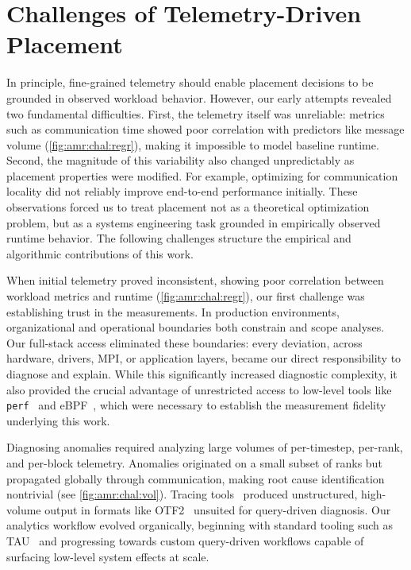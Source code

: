 \section{Challenges of Telemetry-Driven Placement}
\label{sec:amr:chal}


\figAmrChalRegr
\figAmrChalVol

In principle, fine-grained telemetry should enable placement decisions to be grounded in observed
workload behavior.
However, our early attempts revealed two fundamental difficulties.
First, the telemetry itself was unreliable: metrics such as communication time showed poor
correlation with predictors like message volume (\cref{fig:amr:chal:regr}), making it impossible to
model baseline runtime.
Second, the magnitude of this variability also changed unpredictably as placement properties
were modified.
For example, optimizing for communication locality did not reliably improve end-to-end performance
initially.
These observations forced us to treat placement not as a theoretical optimization problem, but as a
systems engineering task grounded in empirically observed runtime behavior.
The following challenges structure the empirical and algorithmic contributions of this work.


When initial telemetry proved inconsistent, showing poor correlation between workload metrics and
runtime (\cref{fig:amr:chal:regr}), our first challenge was establishing trust in the measurements.
In production environments, organizational and operational boundaries both constrain and scope
analyses.
Our full-stack access eliminated these boundaries: every deviation, across hardware, drivers, MPI,
or application layers, became our direct responsibility to diagnose and explain.
While this significantly increased diagnostic complexity, it also provided the crucial advantage of
unrestricted access to low-level tools like \texttt{perf}~\cite{:PerfLinuxProfiling} and
eBPF~\cite{:eBPF}, which were necessary to establish the measurement fidelity underlying this
work.

Diagnosing anomalies required analyzing large volumes of per-timestep, per-rank, and per-block
telemetry.
Anomalies originated on a small subset of ranks but propagated globally through communication,
making root cause identification nontrivial (see \cref{fig:amr:chal:vol}).
Tracing tools~\cite{Shend2006:TAU,Mey2012:Score-P} produced unstructured, high-volume output in
formats like OTF2~\cite{Mey2012:Score-P} unsuited for query-driven diagnosis.
Our analytics workflow evolved organically, beginning with standard tooling such as
TAU~\cite{Shend2006:TAU} and progressing towards custom query-driven workflows capable of surfacing
low-level system effects at scale.

